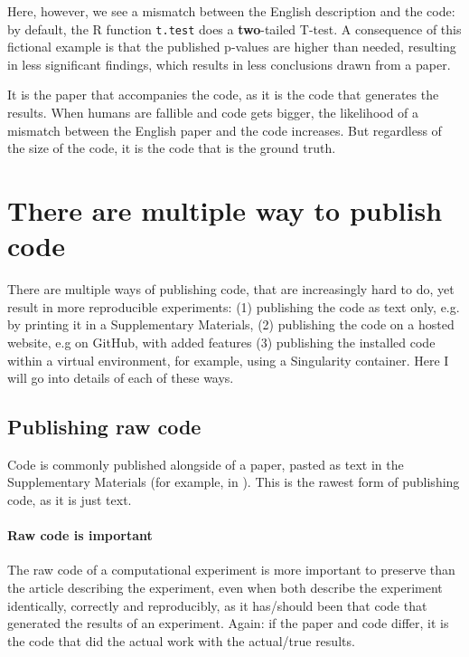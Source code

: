 Here, however, we see a mismatch between the English description and the code:
by default, the R function \verb|t.test| does a \textbf{two}-tailed T-test.
A consequence of this fictional example is that the published p-values are
higher than needed, resulting in less significant findings, which
results in less conclusions drawn from a paper.

It is the paper that accompanies the code,
as it is the code that generates the results.
When humans are fallible and code gets bigger, the likelihood of
a mismatch between the English paper and the code increases.
But regardless of the size of the code, 
it is the code that is the ground truth.

\section{There are multiple way to publish code}

There are multiple ways of publishing code,
that are increasingly hard to do, yet result
in more reproducible experiments:
(1) publishing the code as text only, e.g. by printing
it in a Supplementary Materials, (2) publishing
the code on a hosted website, e.g on GitHub, with
added features (3) publishing 
the installed code within a virtual environment,
for example, using a Singularity container.
Here I will go into details of each of these ways.

\subsection{Publishing raw code}

Code is commonly published alongside of a 
paper, pasted as text in the Supplementary Materials 
(for example, in \cite{labrecque2019interpretation}).
This is the rawest form of publishing code,
as it is just text.

\paragraph{Raw code is important}

The raw code of a computational experiment is
more important to preserve than the article describing
the experiment, even when both describe the experiment identically,
correctly and reproducibly, 
as it has/should been that code that generated the results of an experiment.
Again: if the paper and code differ, it is the code that did
the actual work with the actual/true results.

